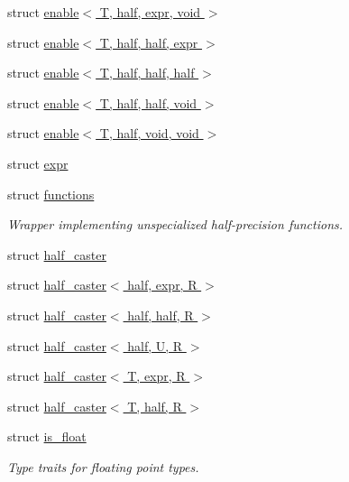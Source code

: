 \begin{DoxyCompactItemize}
\item 
struct \hyperlink{structhalf__float_1_1detail_1_1enable_3_01T_00_01half_00_01expr_00_01void_01_4}{enable$<$ T, half, expr, void $>$}
\item 
struct \hyperlink{structhalf__float_1_1detail_1_1enable_3_01T_00_01half_00_01half_00_01expr_01_4}{enable$<$ T, half, half, expr $>$}
\item 
struct \hyperlink{structhalf__float_1_1detail_1_1enable_3_01T_00_01half_00_01half_00_01half_01_4}{enable$<$ T, half, half, half $>$}
\item 
struct \hyperlink{structhalf__float_1_1detail_1_1enable_3_01T_00_01half_00_01half_00_01void_01_4}{enable$<$ T, half, half, void $>$}
\item 
struct \hyperlink{structhalf__float_1_1detail_1_1enable_3_01T_00_01half_00_01void_00_01void_01_4}{enable$<$ T, half, void, void $>$}
\item 
struct \hyperlink{structhalf__float_1_1detail_1_1expr}{expr}
\item 
struct \hyperlink{structhalf__float_1_1detail_1_1functions}{functions}
\begin{DoxyCompactList}\small\item\em Wrapper implementing unspecialized half-\/precision functions. \end{DoxyCompactList}\item 
struct \hyperlink{structhalf__float_1_1detail_1_1half__caster}{half\+\_\+caster}
\item 
struct \hyperlink{structhalf__float_1_1detail_1_1half__caster_3_01half_00_01expr_00_01R_01_4}{half\+\_\+caster$<$ half, expr, R $>$}
\item 
struct \hyperlink{structhalf__float_1_1detail_1_1half__caster_3_01half_00_01half_00_01R_01_4}{half\+\_\+caster$<$ half, half, R $>$}
\item 
struct \hyperlink{structhalf__float_1_1detail_1_1half__caster_3_01half_00_01U_00_01R_01_4}{half\+\_\+caster$<$ half, U, R $>$}
\item 
struct \hyperlink{structhalf__float_1_1detail_1_1half__caster_3_01T_00_01expr_00_01R_01_4}{half\+\_\+caster$<$ T, expr, R $>$}
\item 
struct \hyperlink{structhalf__float_1_1detail_1_1half__caster_3_01T_00_01half_00_01R_01_4}{half\+\_\+caster$<$ T, half, R $>$}
\item 
struct \hyperlink{structhalf__float_1_1detail_1_1is__float}{is\+\_\+float}
\begin{DoxyCompactList}\small\item\em Type traits for floating point types. \end{DoxyCompactList}\item 

\end{DoxyCompactItemize}
